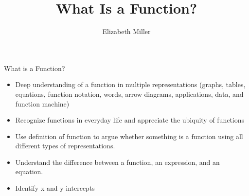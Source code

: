 \documentclass{ximera}
\author{Elizabeth Miller}
\title{What Is a Function?}
\begin{document}
\begin{abstract}
\end{abstract}
\maketitle


\begin{objectives}

\item What is a Function?
\begin{itemize}
	\item Deep understanding of a function in multiple representations (graphs, tables, equations, function notation, words, arrow diagrams, applications, data, and function machine) 
	\item Recognize functions in everyday life and appreciate the ubiquity of functions 
	\item Use definition of function to argue whether something is a function using all different types of representations.   
	\item Understand the difference between a function, an expression, and an equation. 
	\item Identify x and y intercepts 
\end{itemize}




\end{objectives}
\end{document}
